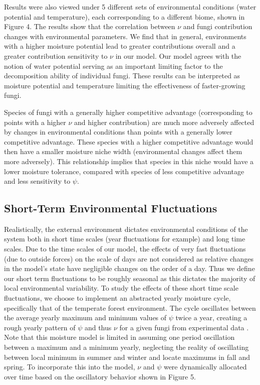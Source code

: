 \documentclass[12pt]{article}
\begin{document}
\begin{multicols}{2}

Results were also viewed under 5 different sets of environmental conditions (water potential and temperature), each corresponding to a different biome, shown in Figure 4. The results show that the correlation between $\nu$ and fungi contribution changes with environmental parameters. We find that in general, environments with a higher moisture potential lead to greater contributions overall and a greater contribution sensitivity to $\nu$ in our model. Our model agrees with the notion of water potential serving as an important limiting factor to the decomposition ability of individual fungi. These results can be interpreted as moisture potential and temperature limiting the effectiveness of faster-growing fungi.  

Species of fungi with a generally higher competitive advantage (corresponding to points with a higher $\nu$ and higher contribution) are much more adversely affected by changes in environmental conditions than points with a generally lower competitive advantage. These species with a higher competitive advantage would then have a smaller moisture niche width (environmental changes affect them more adversely). This relationship implies that species in this niche would have a lower moisture tolerance, compared with species of less competitive advantage and less sensitivity to $\psi$. %

\subsection{Short-Term Environmental Fluctuations}


Realistically, the external environment dictates environmental conditions of the system both in short time scales (year fluctuations for example) and long time scales. Due to the time scales of our model, the effects of very fast fluctuations (due to outside forces) on the scale of days are not considered as relative changes in the model's state have negligible changes on the order of a day. Thus we define our short term fluctuations to be roughly seasonal as this dictates the majority of local environmental variability. To study the effects of these short time scale fluctuations, we choose to implement an abstracted yearly moisture cycle, specifically that of the temperate forest environment. The cycle oscillates between the average yearly maximum and minimum values of $\psi$ twice a year, creating a rough yearly pattern of $\psi$ and thus $\nu$ for a given fungi from experimental data \cite{Zobel2001}\cite{Maynard2019}. Note that this moisture model is limited in assuming one period oscillation between a maximum and a minimum yearly, neglecting the reality of oscillating between local minimum in summer and winter and locate maximums in fall and spring. To incorporate this into the model, $\nu$ and $\psi$ were dynamically allocated over time based on the oscillatory behavior shown in Figure 5. 


\end{multicols}
\end{document}
